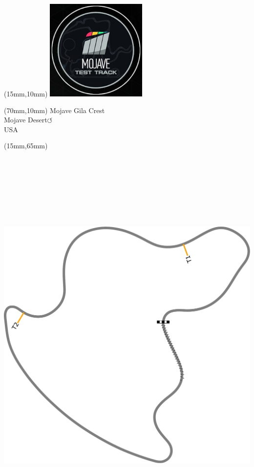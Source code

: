 \null\newpage
\begin{textblock*}{50mm}(15mm,10mm)%
\includegraphics[width=50mm]{LG/MOJA.png}
\end{textblock*}
\begin{textblock*}{130mm}(70mm,10mm)%
{\fontsize{20}{20}\selectfont Mojave Gila Crest\\}
{\fontsize{16}{16}\selectfont Mojave Desert\hfill \huge$\circlearrowleft$\\}
{\fontsize{12}{12}\selectfont USA\\}
\end{textblock*}
\begin{textblock*}{185mm}(15mm,65mm)%
\centering
\mbox{\includegraphics[width=185mm,height=210mm,keepaspectratio]{PT/MOJAGC.pdf}}
\end{textblock*}
